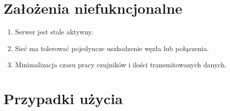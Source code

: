 \documentclass[a4paper,11pt]{article}
\begin{document}
\section{Założenia niefukncjonalne}

\begin{enumerate}
  \item Serwer jest stale aktywny.
  \item Sieć ma tolerować pojedyncze uszkodzenie węzła lub połączenia.
  \item Minimalizacja czasu pracy czujników i ilości transmitowanych danych.
\end{enumerate}

\section{Przypadki użycia}\label{PU}
\end{document}
